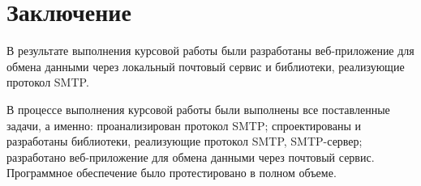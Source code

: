 \chapter*{Заключение}

В результате выполнения курсовой работы были разработаны веб-приложение для обмена данными через локальный почтовый сервис и библиотеки, реализующие протокол SMTP.

В процессе выполнения курсовой работы были выполнены все поставленные задачи, а именно: проанализирован протокол SMTP; спроектированы и разработаны библиотеки, реализующие протокол SMTP, SMTP-сервер; разработано веб-приложение для обмена данными через почтовый сервис. Программное обеспечение было протестировано в полном объеме.